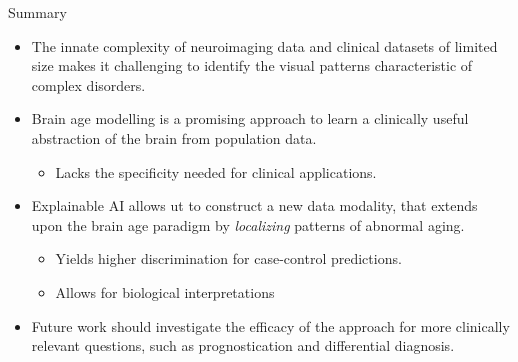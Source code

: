 \documentclass{beamer}
\begin{document}
    \begin{frame}[t]{Summary}
        \setlength\itemsep{0.05em}
        \begin{itemize}
            \item The innate complexity of neuroimaging data and clinical datasets of limited size makes it challenging to identify the visual patterns characteristic of complex disorders.
            \item Brain age modelling is a promising approach to learn a clinically useful abstraction of the brain from population data.
            \begin{itemize}
                \setlength\itemsep{0.1em}
                \item Lacks the specificity needed for clinical applications.
            \end{itemize}
            \item Explainable AI allows ut to construct a new data modality, that extends upon the brain age paradigm by \textit{localizing} patterns of abnormal aging.
            \begin{itemize}
                \setlength\itemsep{0.1em}
                \item Yields higher discrimination for case-control predictions.
                \item Allows for biological interpretations
            \end{itemize}
            \item Future work should investigate the efficacy of the approach for more clinically relevant questions, such as prognostication and differential diagnosis.
        \end{itemize}
    \end{frame}
\end{document}
